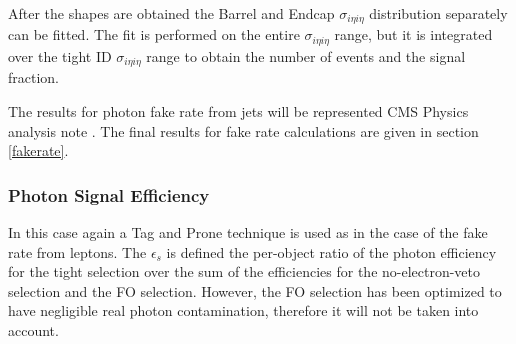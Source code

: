 \documentclass[12pt,oneandhalf,chaparabic,phys,ms,eng]{metu}
\begin{document}
After the shapes are obtained the Barrel and Endcap $\sigma_{i \eta i \eta}$ distribution separately can be fitted. The fit is performed on the entire $\sigma_{i \eta i \eta}$ range, but it is integrated over the tight ID $\sigma_{i \eta i \eta}$ range to obtain the number of events and the signal fraction. 

The results for photon fake rate from jets will be represented CMS Physics analysis note \cite{R34}. The final results for fake rate calculations are given in section \ref{fakerate}.

\subsubsection{Photon Signal Efficiency}

In this case again a Tag and Prone technique is used as in the case of the fake rate from leptons. The $\epsilon_{s}$
is defined the per-object ratio of the photon efficiency for the tight selection over the sum of the efficiencies  for 
the no-electron-veto selection and the FO selection. However, the FO selection has been optimized to have negligible real photon contamination, therefore it will not be taken into account.
\end{document}
